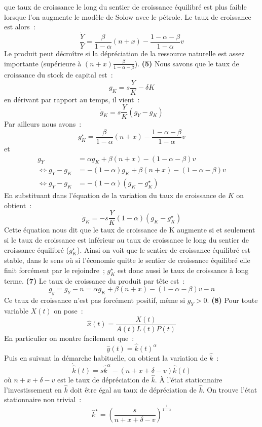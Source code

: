 \documentclass[10pt,a4paper,notitlepage,onecolumn]{article}
\newcommand{\question}[1]{\textbf{(#1)}}
\newcommand{\growth}[1]{\frac{\dot{#1}}{#1}}
\begin{document}
que taux de croissance le long  du sentier de croissance équilibré est
plus  faible  lorsque  l'on  augmente  le  modèle  de  Solow  avec  le
pétrole. Le taux de croissance est alors :
\[
\growth{Y} = \frac{\beta}{1-\alpha} (n+x) - \frac{1-\alpha-\beta}{1-\alpha}v
\]
Le produit peut décroître si la dépréciation de la ressource naturelle
est assez importante (supérieure à $(n+x)\frac{\beta}{1-\alpha-\beta}$). \question{5} Nous savons que le taux de croissance du stock de capital est :
\[
g_K = s \frac{Y}{K} -\delta K
\]
en dérivant par rapport au temps, il vient :
\[
\dot g_K = s \frac{Y}{K}\left(g_Y - g_K\right)
\]
Par ailleurs nous avons :
\[
g_K^{\star} = \frac{\beta}{1-\alpha} (n+x) - \frac{1-\alpha-\beta}{1-\alpha}v
\]
et
\[
\begin{split}
  g_Y &= \alpha g_K  + \beta (n+x) - (1-\alpha-\beta)v\\
\Leftrightarrow g_Y-g_K  &= -(1-\alpha) g_K + \beta (n+x) - (1-\alpha-\beta)v\\
\Leftrightarrow g_Y-g_K  &= -(1-\alpha)\left(g_K - g_K^{\star}\right)
\end{split}
\]
En substituant dans l'équation de la variation du taux de croissance de $K$ on obtient :
\[
\dot g_K = -s \frac{Y}{K}(1-\alpha)\left(g_K - g_K^{\star}\right)
\]
Cette équation nous dit que le taux  de croissance de K augmente si et
seulement si le taux de croissance est inférieur au taux de croissance
le long du  sentier de croissance équilibré  ($g_K^{\star}$). Ainsi on
voit que le  sentier de croissance équilibré est stable,  dans le sens
où si l'économie quitte le  sentier de croissance équilibré elle finit
forcément par le  rejoindre ; $g_K^{\star}$ est donc aussi  le taux de
croissance à long terme. \question{7} Le taux de croissance du produit
par tête est :
\[
g_y = g_Y - n = \alpha g_K  + \beta (n+x) - (1-\alpha-\beta)v -n
\]
Ce  taux   de  croissance  n'est   pas  forcément  positif,   même  si
$g_Y>0$. \question{8} Pour toute variable $X(t)$ on pose :
\[
\hat x (t) = \frac{X(t)}{A(t)L(t)P(t)}
\]
En particulier on montre facilement que :
\[
\hat y(t) = \hat k(t) ^{\alpha}
\]
Puis en suivant la démarche habituelle, on obtient la variation de $\hat k$ :
\[
\dot{\hat{k}}(t) = s \hat{k}^{\alpha} - (n+x+\delta-v)\hat{k}(t)
\]
où $n+x+\delta-v$  est le taux de  dépréciation de $\hat k$.  À l'état
stationnaire l'investissement  en $\hat k$  doit être égal au  taux de
dépréciation de $\hat k$. On trouve l'état stationnaire non trivial :
\[
\hat k ^{\star} = \left(\frac{s}{n+x+\delta-v}\right)^{\frac{1}{1-\alpha}}
\]
\end{document}
